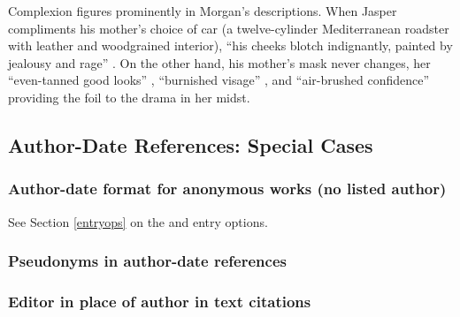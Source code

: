 \documentclass[11pt,letterpaper,oneside]{article}
\begin{document}
\begin{citeref}%
\item Complexion figures prominently in Morgan's descriptions. When
Jasper compliments his mother's choice of car (a twelve-cylinder
Mediterranean roadster with leather and wood\-grained interior), ``his
cheeks blotch indignantly, painted by jealousy and rage''
\parencite[47]{chaston2000}. On the other hand, his mother's mask
never changes, her ``even-tanned good looks''
\parencite[56]{chaston2000}, ``burnished visage''
\parencite[101]{chaston2000}, and ``air-brushed confidence''
\parencite[211]{chaston2000} providing the foil to the drama in her
midst.
\end{citeref}

\setcounter{subsection}{2}
\subsection{Author-Date References: Special Cases}
\setcounter{subsection}{15}

\setcounter{subsubsection}{33}
\subsubsection{Author-date format for anonymous works (no listed author)}

See Section \ref{entryops} on the  and 
entry options.

\begin{citeref}
\item \parencite{anon1610}
\item \parencite{anon1547}
\item \parencite{horsley1796}
\item \parencite{hawkes1834}
\end{citeref}

\subsubsection{Pseudonyms in author-date references}

\begin{citeref}
\item \parencite{stendhal1925}
\end{citeref}

\subsubsection{Editor in place of author in text citations}
\end{document}
